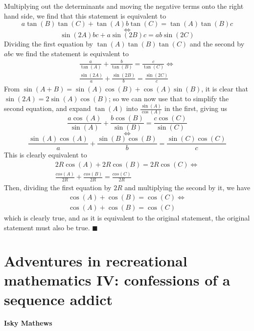 \documentclass[11pt,a4paper]{report}
\begin{document}
\begin{multicols}{2}
		Multiplying out the determinants and moving the negative terms onto the right hand side, we find that this statement is equivalent to
		\[a\tan(B)\tan(C)+\tan(A)b\tan(C)=\tan(A)\tan(B)c\]\[\iff{}\]\[\sin(2A)bc+a\sin(2B)c=ab\sin(2C)
		\]
		Dividing the first equation by \(\tan(A)\tan(B)\tan(C)\) and the second by \(abc\) we find the statement is equivalent to
		\[
		\begin{split}
		\frac{a}{\tan(A)}+\frac{b}{\tan(B)}=\frac{c}{\tan(C)} 
		\iff \\
		\frac{\sin(2A)}{a}+\frac{\sin(2B)}{b}=\frac{\sin(2C)}{c}
		\end{split}
		\]
		From \(\sin(A+B)=\sin(A)\cos(B)+\cos(A)\sin(B)\), it is clear that \(\sin(2A)=2\sin(A)\cos(B)\); so we can now use that to simplify the second equation, and expand \(\tan(A)\) into \(\frac{\sin(A)}{\cos(A)}\) in the first, giving us
		\[
		\frac{a\cos(A)}{\sin(A)}+\frac{b\cos(B)}{\sin(B)}=\frac{c\cos(C)}{\sin(C)}\]
		\[\iff\]
		\[\frac{\sin(A)\cos(A)}{a}+\frac{\sin(B)\cos(B)}{b}=\frac{\sin(C)\cos(C)}{c}
		\]
		This is clearly equivalent to
		\[\begin{split}
		2R\cos(A)+2R\cos(B)=2R\cos(C)
		\iff\\
		\frac{cos(A)}{2R}+\frac{cos(B)}{2R}=\frac{cos(C)}{2R}
		\end{split}
		\]
		Then, dividing the first equation by \(2R\) and multiplying the second by it, we have
		\[\begin{split}
		\cos(A)+\cos(B)=\cos(C)
		\iff\\
		\cos(A)+\cos(B)=\cos(C)
		\end{split}
		\]
		which is clearly true, and as it is equivalent to the original statement, the original statement must also be true. \(\blacksquare{}\)
		
	\end{multicols}
	
	\section{Adventures in recreational mathematics IV: confessions of a sequence addict}
	
	\textbf{Isky Mathews}
	
\end{document}
